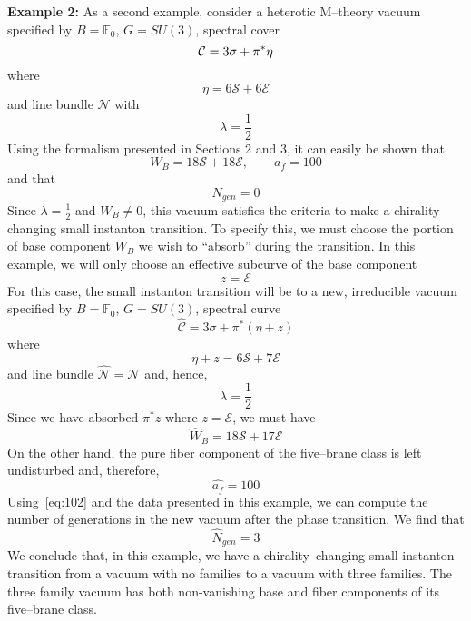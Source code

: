 \documentclass[a4paper,12pt]{article}
\numberwithin{equation}{section}
\def\cC{{\mathcal C}}
\def\cE{{\mathcal E}}
\def\cN{{\mathcal N}}
\def\cS{{\mathcal S}}
\theoremstyle{plain}
\begin{document}
\bigskip

\noindent
{\bf Example 2:} \quad
As a second example, consider a heterotic M--theory vacuum specified by
$B={\mathbb F}_{0}$, $G=SU(3)$, spectral cover
\begin{equation}
{\cal{C}}=3\sigma+\pi^{*}\eta
\label{eq:115}
\end{equation}
where
\begin{equation}
\eta=6\cS+6\cE
\label{eq:116}
\end{equation}
and line bundle $\cN$ with
\begin{equation}
\lambda=\frac{1}{2}
\label{eq:117}
\end{equation}
Using the formalism presented in Sections 2 and 3, it can easily be shown that
\begin{equation}
W_{B}=18\cS+18\cE, \qquad a_{f}=100
\label{eq:118}
\end{equation}
and that 
\begin{equation}
N_{gen}=0
\label{eq:119}
\end{equation}
Since $\lambda=\frac{1}{2}$ and $W_{B} \neq 0$, this vacuum satisfies the
criteria to make a chirality--changing small instanton transition. To specify
this, we must choose the portion of base component $W_{B}$ we wish to
``absorb'' during the transition. In this example, we will only choose an
effective subcurve of the base component
\begin{equation}
z=\cE
\label{eq:120}
\end{equation}
For this case, the small instanton transition will be to a new, irreducible
vacuum specified by $B={\mathbb F}_{0}$, $G=SU(3)$, spectral curve
\begin{equation}
\widehat{\cC}=3\sigma+\pi^{*}(\eta+ z)
\label{eq:121}
\end{equation}
where
\begin{equation}
\eta+ z=6\cS+7\cE
\label{eq:122}
\end{equation}
and line bundle $\widehat{\cN}=\cN$ and, hence,
\begin{equation}
\lambda=\frac{1}{2}
\label{eq:123}
\end{equation}
Since we have absorbed $\pi^{*}z$ where $z=\cE$, we must have
\begin{equation}
\widehat{W}_{B}=18\cS+17\cE
\label{eq:124}
\end{equation}
On the other hand, the pure fiber component of the five--brane class is left
undisturbed and, therefore,
\begin{equation}
\hat{a_{f}}=100
\label{eq:125}
\end{equation}
Using~\eqref{eq:102} and the data presented in this example, we can compute
the number of generations in the new vacuum after the phase transition. We
find that
\begin{equation}
\hat{N}_{gen}=3
\label{eq:126}
\end{equation}
We conclude that, in this example, we have a chirality--changing small
instanton transition from a vacuum with no families to a vacuum with three
families. The three family vacuum has both non-vanishing 
base and fiber components of its five--brane class.
\end{document}
